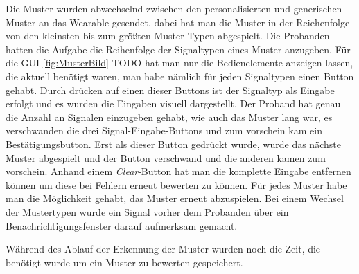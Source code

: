 Die Muster wurden abwechselnd zwischen den personalisierten und generischen Muster an das Wearable gesendet, dabei hat man die Muster in der Reiehenfolge von den kleinsten bis zum größten Muster-Typen abgespielt. 
Die Probanden hatten die Aufgabe die Reihenfolge der Signaltypen eines Muster anzugeben.
Für die GUI \autoref{fig:MusterBild} TODO hat man nur die Bedienelemente anzeigen lassen, die aktuell benötigt waren, man habe nämlich für jeden Signaltypen einen Button gehabt. Durch drücken auf einen dieser Buttons ist der Signaltyp als Eingabe erfolgt und es wurden die Eingaben visuell dargestellt.
Der Proband hat genau die Anzahl an Signalen einzugeben gehabt, wie auch das Muster lang war, es verschwanden die drei Signal-Eingabe-Buttons und zum vorschein kam ein Bestätigungsbutton. Erst als dieser Button gedrückt wurde, wurde das nächste Muster abgespielt und der Button verschwand und die anderen kamen zum vorschein. 
Anhand einem \textit{Clear}-Button hat man die komplette Eingabe entfernen können um diese bei Fehlern erneut bewerten zu können.
Für jedes Muster habe man die Möglichkeit gehabt, das Muster erneut abzuspielen.  
Bei einem Wechsel der Mustertypen wurde ein Signal vorher dem Probanden über ein Benachrichtigungsfenster darauf aufmerksam gemacht.

Während des Ablauf der Erkennung der Muster wurden noch die Zeit, die benötigt wurde um ein Muster zu bewerten gespeichert. 











